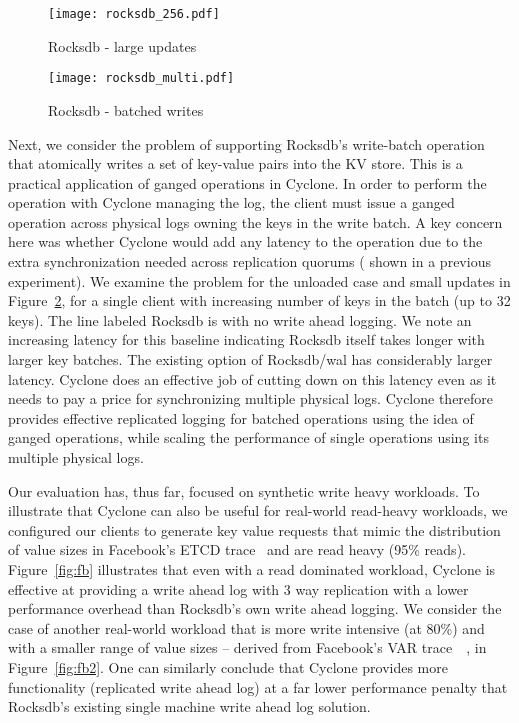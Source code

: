 \documentclass[twocolumn]{article}
\begin{document}
  \begin{figure}
    \texttt{[image: rocksdb\_256.pdf]}
    \caption{Rocksdb - large updates}
    \label{fig:rocksdb_256}
  \end{figure}
   
  \begin{figure}
    \texttt{[image: rocksdb\_multi.pdf]}
    \caption{Rocksdb - batched writes}
    \label{fig:rocksdb_multi}
\end{figure}

Next, we consider the problem of supporting Rocksdb's write-batch operation that
atomically writes a set of key-value pairs into the KV store. This is a
practical application of ganged operations in Cyclone. In order to
perform the operation with Cyclone managing the log, the client must issue a
ganged operation across physical logs owning the keys in the write batch.
A key concern here was whether Cyclone would add any latency to the
operation due to the extra synchronization needed across replication quorums (
shown in a previous experiment).
We examine the problem for the unloaded case
and small updates in Figure~\ref{fig:rocksdb_multi}, for a single client with
increasing number of keys in the batch (up to 32 keys).
The line labeled Rocksdb is with no write ahead logging. We note an increasing
latency for this baseline indicating Rocksdb itself takes longer
with larger key batches. The existing option of Rocksdb/wal has considerably
larger latency. Cyclone does an effective job of cutting down on this latency
even as it needs to pay a price for synchronizing multiple physical
logs. Cyclone therefore provides effective replicated logging for batched
operations using the idea of ganged operations, while scaling the performance of
single operations using its multiple physical logs.

Our evaluation has, thus far, focused on synthetic write heavy workloads. To
illustrate that Cyclone can also be useful for real-world read-heavy workloads, 
we configured our clients to generate key value requests that mimic the
distribution of value sizes in Facebook's ETCD
trace~\cite{fb_workload_analysis,fb_scaling_memcache} and are read heavy (95\%
reads). Figure~\ref{fig:fb} illustrates that even with a read dominated
workload, Cyclone is effective at providing a write ahead log with 3 way
replication with a lower performance overhead than Rocksdb's own write ahead
logging. We consider the case of another real-world workload that is more write 
intensive (at 80\%) and with a smaller range of value sizes -- derived from
Facebook's VAR trace~~\cite{fb_workload_analysis,fb_scaling_memcache}, in
Figure~\ref{fig:fb2}. One can similarly conclude that Cyclone provides more
functionality (replicated write ahead log) at a far lower performance penalty
that Rocksdb's existing single machine write ahead log solution.
\end{document}
